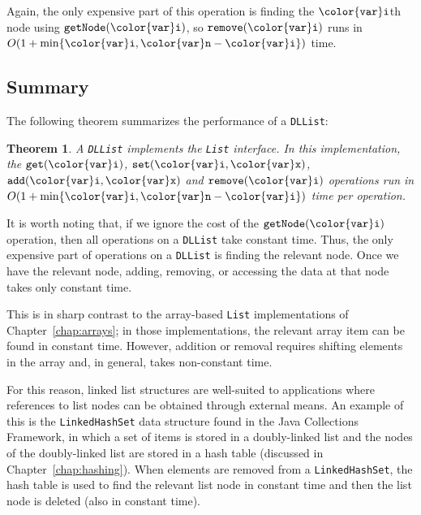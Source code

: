 \documentclass[10pt]{book}
\newcommand{\cpponly}[1]{}\newcommand{\javaonly}[1]{#1}\newcommand{\pcodeonly}[1]{}\newcommand{\notpcode}[1]{#1}\newcommand{\lang}{Java}
\newcommand{\chapref}[1]{Chapter~\ref{chap:#1}}
\theoremstyle{plain}
\newtheorem{thm}{Theorem}[chapter]
\newcommand{\thmlabel}[1]{\label{thm:#1}}
\theoremstyle{definition}
\begin{document}
Again, the only expensive part of this operation is finding the \ensuremath{\mathtt{{\color{var}i}}}th node
using \ensuremath{\mathtt{getNode({\color{var}i})}}, so \ensuremath{\mathtt{remove({\color{var}i})}} runs in $O(1+\min\{\ensuremath{\mathtt{{\color{var}i}}}, \ensuremath{\mathtt{{\color{var}n}}}-\ensuremath{\mathtt{{\color{var}i}}}\})$
time.

\subsection{Summary}

The following theorem summarizes the performance of a \texttt{DLList}:

\begin{thm}\thmlabel{dllist}
  A \texttt{DLList} implements the \texttt{List} interface.  In this implementation,
  the \ensuremath{\mathtt{get({\color{var}i})}}, \ensuremath{\mathtt{set({\color{var}i},{\color{var}x})}}, \ensuremath{\mathtt{add({\color{var}i},{\color{var}x})}} and \ensuremath{\mathtt{remove({\color{var}i})}} operations run
  in $O(1+\min\{\ensuremath{\mathtt{{\color{var}i}}},\ensuremath{\mathtt{{\color{var}n}}}-\ensuremath{\mathtt{{\color{var}i}}}\})$ time per operation.
\end{thm}

It is worth noting that, if we ignore the cost of the \ensuremath{\mathtt{getNode({\color{var}i})}}
operation, then all operations on a \texttt{DLList} take constant time.
Thus, the only expensive part of operations on a \texttt{DLList} is finding
the relevant node.  Once we have the relevant node, adding, removing,
or accessing the data at that node takes only constant time.

This is in sharp contrast to the array-based \texttt{List} implementations of
\chapref{arrays}; in those implementations, the relevant array
item can be found in constant time. However, addition or removal requires
shifting elements in the array and, in general, takes non-constant time.

For this reason, linked list structures are well-suited to applications
where references to list nodes can be obtained through external means.
\javaonly{An example of this is the \texttt{LinkedHashSet} data structure found in the
Java Collections Framework, in which a set of items is stored in a
doubly-linked list and the nodes of the doubly-linked list are stored
in a hash table (discussed in \chapref{hashing}).  When elements
are removed from a \texttt{LinkedHashSet}, the hash table is used to find the
relevant list node in constant time and then the list node is deleted
(also in constant time).}
\cpponly{For example, pointers to the nodes of a linked list could be
stored in a \texttt{USet}.  Then, to remove an item \ensuremath{\mathtt{{\color{var}x}}} from the linked list,
the node that contains \ensuremath{\mathtt{{\color{var}x}}} can be found quickly using the \texttt{Uset} and
the node can be removed from the list in constant time.}
\end{document}

